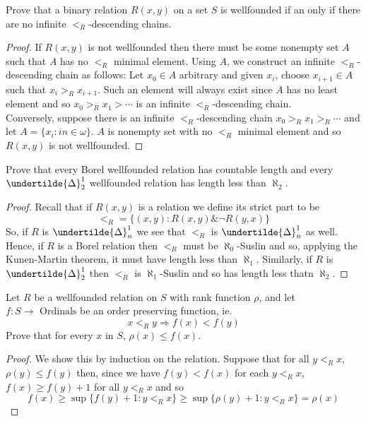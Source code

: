 
\begin{exercise}
    Prove that a binary relation $R(x,y)$ on a set $S$ is wellfounded if an only if there are no infinite $<_R$-descending chains. 
\end{exercise}

\begin{proof}
    If $R(x,y)$ is not wellfounded then there must be some nonempty set $A$ such that $A$ has no $<_R$ minimal element. Using $A$, we construct an infinite $<_R$-descending chain as follows: Let $x_0 \in A$ arbitrary and given $x_i$, choose $x_{i+1} \in A$ such that $x_i >_R x_{i+1}$. Such an element will always exist since $A$ has no least element and so $x_0 >_R x_1 > \cdots$ is an infinite $<_R$-descending chain. \\ 
    Conversely, suppose there is an infinite $<_{R}$-descending chain $x_0 >_R x_1 >_R \cdots$ and let $A = \{x_i \colon in \in \omega\}$. $A$ is nonempty set with no $<_R$ minimal element and so $R(x,y)$ is not wellfounded. 
\end{proof}

\begin{exercise}
    Prove that every Borel wellfounded relation has countable length and every $\undertilde{\Delta}^1_2$ wellfounded relation has length less than $\aleph_2$. 
\end{exercise}

\begin{proof}
    Recall that if $R(x,y)$ is a relation we define its strict part to be 
    \[ <_R = \{(x,y) \colon R(x,y) \& \neg R(y,x)\} \] 
    So, if $R$ is $\undertilde{\Delta}^1_n$ we see that $<_R$ is $\undertilde{\Delta}^1_n$ as well. Hence, if $R$ is a Borel relation then $<_R$ must be $\aleph_0$-Suslin and so, applying the Kunen-Martin theorem, it must have length less than $\aleph_1$. Similarly, if $R$ is $\undertilde{\Delta}_2^1$ then $<_R$ is $\aleph_1$-Suslin and so has length less thatn $\aleph_2$.
\end{proof}

\begin{exercise}
    Let $R$ be a wellfounded relation on $S$ with rank function $\rho$, and let $f: S \to \text{ Ordinals}$ be an order preserving function, ie. 
    \[ x<_Ry \Rightarrow f(x) < f(y) \]
    Prove that for every $x$ in $S$, $\rho(x) \le f(x)$. 
\end{exercise}

\begin{proof}
    We show this by induction on the relation. Suppose that for all $y <_R x$, $\rho(y) \le f(y)$ then, since we have $f(y) < f(x)$ for each $y <_R x$, $f(x) \ge f(y) +1$ for all $y <_R x$ and so 
    \[ f(x) \ge \sup\{ f(y)+1 \colon y <_R x\} \ge \sup\{\rho(y)+1 \colon y <_R x\} = \rho(x)\] 
\end{proof}

